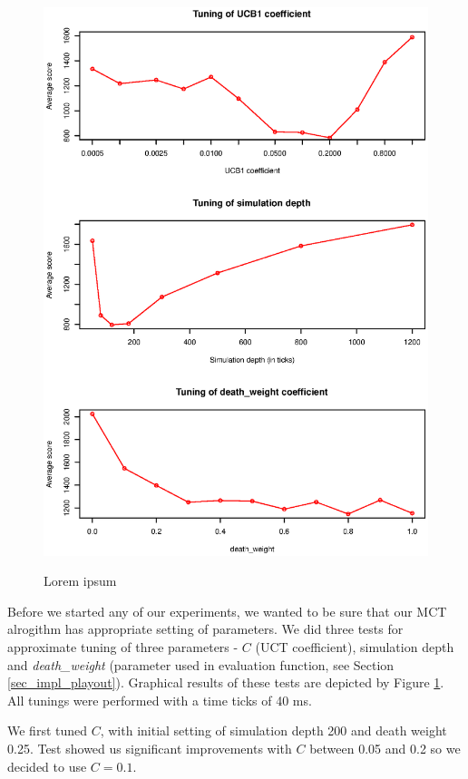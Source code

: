 \begin{figure}
\begin{center}
\includegraphics{img/mcts-tuning.eps}
\end{center}
\caption{\footnotesize Lorem ipsum}{\footnotesize }
\label{fig_mcts_tuning}
\end{figure}

Before we started any of our experiments, we wanted to be sure that our MCT alrogithm has
appropriate setting of parameters. We did three tests for approximate tuning of three
parameters - $C$ (UCT coefficient), simulation depth and \emph{death\_weight} (parameter used in
evaluation function, see Section \ref{sec_impl_playout}). Graphical results of these tests are
depicted by Figure \ref{fig_mcts_tuning}. All tunings were performed with a time ticks of 40
ms.

We first tuned $C$, with initial setting of simulation depth 200 and death weight 0.25. Test
showed us significant improvements with $C$ between 0.05 and 0.2 so we decided to use $C=0.1$.

